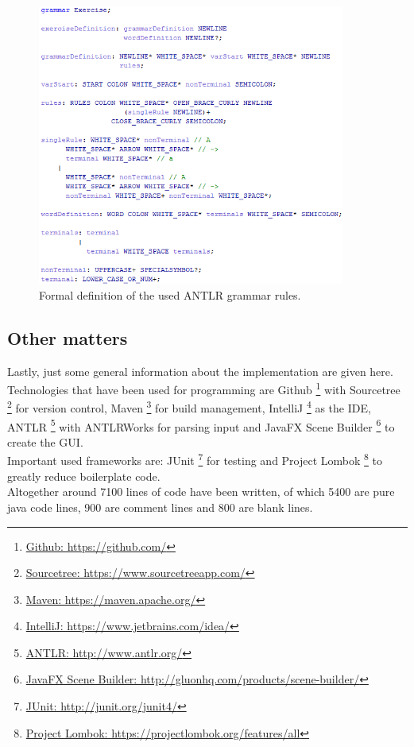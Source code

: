 \begin{figure} [h]
	\centering 
	\includegraphics[width=0.9\textwidth]{abb/antrlRules.png}
	\caption{Formal definition of the used ANTLR grammar rules.}
	\label{antlrGrammarRules}
\end{figure}

\pagebreak
\subsection{Other matters}
Lastly, just some general information about the implementation are given here.\\
Technologies that have been used for programming are 
Github \footnote{\href{https://github.com/}{Github: https://github.com/}} with 
Sourcetree \footnote{\href{https://www.sourcetreeapp.com/}{Sourcetree: https://www.sourcetreeapp.com/}} for version control, 
Maven \footnote{\href{https://maven.apache.org/}{Maven: https://maven.apache.org/}} for build management, 
IntelliJ \footnote{\href{https://www.jetbrains.com/idea/}{IntelliJ: https://www.jetbrains.com/idea/}} as the IDE, 
ANTLR \footnote{\href{http://www.antlr.org/}{ANTLR: http://www.antlr.org/}} with ANTLRWorks for parsing input and 
JavaFX Scene Builder \footnote{\href{http://gluonhq.com/products/scene-builder/}{JavaFX Scene Builder: http://gluonhq.com/products/scene-builder/}} to create the GUI. \\
\noindent Important used frameworks are: 
JUnit \footnote{\href{http://junit.org/junit4/}{JUnit: http://junit.org/junit4/}} for testing and Project 
Lombok \footnote{\href{https://projectlombok.org/features/all}{Project Lombok: https://projectlombok.org/features/all}} to greatly reduce boilerplate code.\\
\noindent Altogether around 7100 lines of code have been written, of which 5400 are pure java code lines, 900 are comment lines and 800 are blank lines.\\ 

\pagebreak